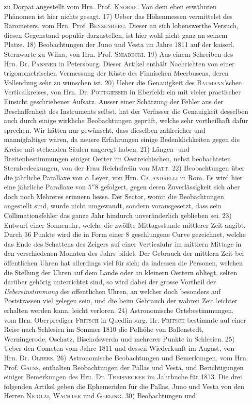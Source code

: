 \noindent zu Dorpat angestellt vom Hrn. Prof. \textsc{Knorre}. Von dem eben erwähnten Phänomen ist hier nichts gesagt. 17) Ueber das Höhenmessen vermittelst des Barometers, vom Hrn. Prof. \textsc{Benzenberg}. Dieser an sich lobenswerthe Versuch, diesen Gegenstand populär darzustellen, ist hier wohl nicht ganz an seinem Platze. 18) Beobachtungen der Juno und Vesta im Jahre 1811 auf der kaiserl. Sternwarte zu Wilna, von Hrn. Prof. \textsc{Sniadecki}. 19) Aus einem Schreiben des Hrn. Dr. \textsc{Pansner} in Petersburg. Dieser Artikel enthält Nachrichten von einer trigonometrischen Vermessung der Küste des Finnischen Meerbusens, deren Vollendung sehr zu wünschen ist. 20) Ueber die Genauigkeit des \textsc{Baumann}'schen Verticalkreises, von Hrn. Dr. \textsc{Pottgiesser} in Eberfeld: ein mit vieler practischer Einsicht geschriebener Aufsatz. Ausser einer Schätzung der Fehler aus der Beschaffenheit des Instruments selbst, hat der Verfasser die Genauigkeit desselben auch durch einige wirkliche Beobachtungen geprüft, welche sehr vortheilhaft dafür sprechen. Wir hätten nur gewünscht, dass dieselben zahlreicher und mannigfaltiger wären, da neuere Erfahrungen einige Bedenklichkeiten gegen die Kreise mit stehenden Säulen angeregt haben. 21) Längen- und Breitenbestimmungen einiger Oerter im Oestreichischen, nebst beobachteten Sternbedeckungen, von der Frau Reichsfreiin von \textsc{Matt}. 22) Beobachtungen über die jährliche Parallaxe von $\alpha$ Leyer, von Hrn. \textsc{Calandrelli} in Rom. Es wird hier eine jährliche Parallaxe von $5''8$ gefolgert, gegen deren Zuverlässigkeit sich aber doch noch Mehreres erinnern liesse. Der Sector, womit die Beobachtungen angestellt sind, wurde nicht umgewandt, sondern vorausgesetzt, dass sein Collimationsfehler das ganze Jahr hindurch unveränderlich geblieben sei. 23) Entwurf einer Sonnenuhr, welche die zwölfte Mittagsstunde mittlerer Zeit angibt. Durch 36 Punkte wird die in Form einer 8 geschlungene Curve gezeichnet, welche das Ende des Schattens des Zeigers auf einer Verticaluhr im mittlern Mittage in den verschiedenen Monaten des Jahrs bildet. Der Gebrauch der mittlern Zeit bei öffentlichen Uhren hat allerdings viel für sich; da indessen die Personen, welchen die Stellung der Uhren auf dem Lande oder an kleinern Oertern obliegt, selten darüber gehörig unterrichtet sind, so wird dabei der grosse Vortheil der \emph{Uebereinstimmung} der öffentlichen Uhren, an welcher doch besonders auf Poststrassen viel gelegen sein, und die beim Gebrauch der wahren Zeit leichter erhalten werden kann, leicht verloren. 24) Astronomische Ortsbestimmungen, vom Hrn. Oberprediger \textsc{Fritsch} in Quedlinburg. Hr. \textsc{Fritsch} bestimmte auf einer Reise nach Schlesien im Sommer 1810 die Polhöhe von Ballenstedt, Werningerode, Oschatz, Bischofswerda und mehrerer Punkte in Schlesien. 25) Ueber den Cometen vom Jahre 1811 und dessen Wiederkunft im August, von Hrn. Dr. \textsc{Olbers}. 26) Astronomische Beobachtungen und Bemerkungen, vom Hrn. Prof. \textsc{Gauss}, enthalten Beobachtungen der Pallas und Vesta, und Berichtigungen einiger Bemerkungen des Hrn. Dr. \textsc{Treisnecker} im Jahrbuche für 1813. Die drei folgenden Artikel geben die Ephemeriden für die Pallas, Juno und Vesta von den Herren \textsc{Nicolai}, \textsc{Wachter} und \textsc{Gerling}. 30) Beobachtungen und 